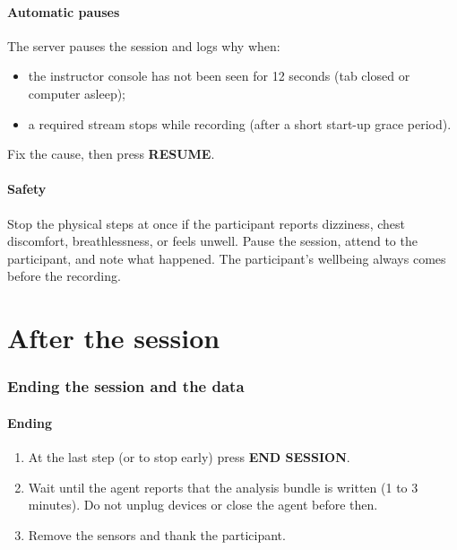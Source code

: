 \documentclass[11pt,a4paper]{article}
\newcommand{\ui}[1]{\textsf{\textbf{#1}}}
\begin{document}
\subsection{Automatic pauses}
The server pauses the session and logs why when:
\begin{itemize}
  \item the instructor console has not been seen for 12 seconds (tab closed or computer asleep);
  \item a required stream stops while recording (after a short start-up grace period).
\end{itemize}
Fix the cause, then press \ui{RESUME}.

\subsection{Safety}
Stop the physical steps at once if the participant reports dizziness, chest discomfort, breathlessness, or feels
unwell. Pause the session, attend to the participant, and note what happened. The participant's wellbeing always comes
before the recording.

\part{After the session}

\section{Ending the session and the data}\label{sec:ending}

\subsection{Ending}
\begin{enumerate}
  \item At the last step (or to stop early) press \ui{END SESSION}.
  \item Wait until the agent reports that the analysis bundle is written (1 to 3 minutes). Do not unplug devices or
    close the agent before then.
  \item Remove the sensors and thank the participant.
\end{enumerate}
\end{document}
